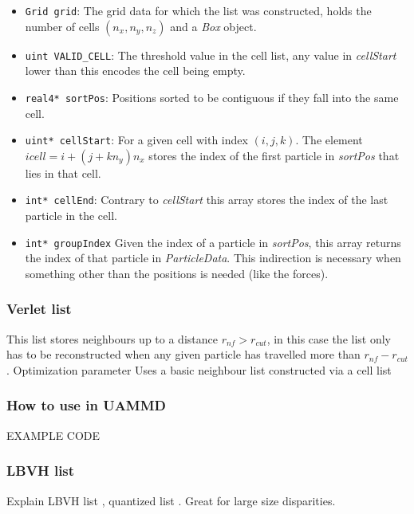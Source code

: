 \documentclass[ twoside,openright,titlepage,numbers=noenddot,%
headinclude,footinclude,cleardoublepage=empty,abstract=on,
BCOR=5mm,paper=a4,fontsize=11pt, dvipsnames
]{scrreprt}
\def\ucpp{uammd_cpp_lexer.py:UAMMDCppLexer -x}
\begin{document}
\begin{itemize}
\item\texttt{Grid grid}:
  The grid data for which the list was constructed, holds the number of cells $(n_x, n_y, n_z)$ and a \emph{Box} object.
\item\texttt{uint VALID_CELL}:
  The threshold value in the cell list, any value in \emph{cellStart} lower than this encodes the cell being empty. 
\item\texttt{real4* sortPos}:
  Positions sorted to be contiguous if they fall into the same cell. 
\item\texttt{uint* cellStart}:
  For a given cell with index $(i,j,k)$. The element $icell = i + (j + kn_y)n_x$ stores the index of the first particle in \emph{sortPos} that lies in that cell.
\item\texttt{int* cellEnd}:
  Contrary to \emph{cellStart} this array stores the index of the last particle in the cell.
\item\texttt{int* groupIndex}
  Given the index of a particle in \emph{sortPos}, this array returns the index of that particle in \emph{ParticleData}.
  This indirection is necessary when something other than the positions is needed (like the forces).
\end{itemize}



\subsubsection{Verlet list}

This list stores neighbours up to a distance $r_{nf} > r_{cut}$, in this case the list only has to be reconstructed when any given particle has travelled more than $r_{nf}-r_{cut}$.
Optimization parameter
Uses a basic neighbour list constructed via a cell list 


\subsubsection{How to use in UAMMD}

EXAMPLE CODE

\subsubsection{LBVH list}
Explain LBVH list \cite{lbvh}, quantized list \cite{quantizedlbvh}. Great for large size disparities.
\end{document}
